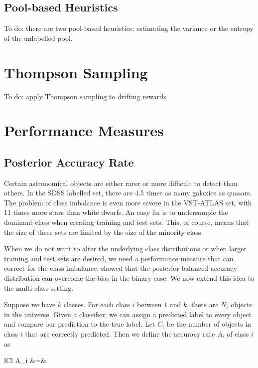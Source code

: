 \subsection{Pool-based Heuristics}
To do: there are two pool-based heuristics: estimating the variance or the entropy of the
unlabelled pool.



\section{Thompson Sampling}

To do: apply Thompson sampling to drifting rewards \cite{gupta11}



\section{Performance Measures}
\label{sec:measures}

\subsection{Posterior Accuracy Rate}
Certain astronomical objects are either rarer or more difficult to detect than others.
In the SDSS labelled set, there are 4.5 times as many galaxies as quasars. The problem
of class imbalance is even more severe in the VST-ATLAS set, with 11 times more stars than
white dwarfs. An easy fix is to undersample the dominant class when creating training and
test sets. This, of course, means that the size of these sets are limited by the size
of the minority class.

When we do not want to alter the underlying class distributions or when larger training and test
sets are desired, we need a performance measure that can correct for the class imbalance.
 showed that the posterior balanced accuracy distribution can overcome
the bias in the binary case. We now extend this idea to the multi-class setting.

Suppose we have $k$ classes. For each class $i$ between $1$ and $k$, there are $N_i$ objects
in the universe. Given a classifier, we can assign a predicted label to every object and
compare our prediction to the true label. Let $C_i$ be the number of objects in class $i$
that are correctly predicted. Then we define the accuracy rate $A_i$ of class $i$ as
	\begin{IEEEeqnarray*}{lCl}
		A_i &=& 
	\end{IEEEeqnarray*}

